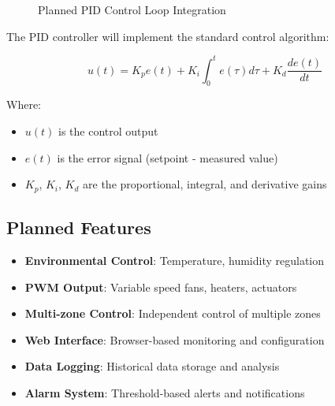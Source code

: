 \documentclass[12pt,a4paper]{article}
\begin{document}
\begin{figure}[h!]
\centering
{}
\caption{Planned PID Control Loop Integration}
\label{fig:pid_control}
\end{figure}

The PID controller will implement the standard control algorithm:

\begin{equation}
u(t) = K_p e(t) + K_i \int_0^t e(\tau) d\tau + K_d \frac{de(t)}{dt}
\end{equation}

Where:
\begin{itemize}
    \item $u(t)$ is the control output
    \item $e(t)$ is the error signal (setpoint - measured value)
    \item $K_p$, $K_i$, $K_d$ are the proportional, integral, and derivative gains
\end{itemize}

\subsection{Planned Features}

\begin{itemize}
    \item \textbf{Environmental Control}: Temperature, humidity regulation
    \item \textbf{PWM Output}: Variable speed fans, heaters, actuators
    \item \textbf{Multi-zone Control}: Independent control of multiple zones
    \item \textbf{Web Interface}: Browser-based monitoring and configuration
    \item \textbf{Data Logging}: Historical data storage and analysis
    \item \textbf{Alarm System}: Threshold-based alerts and notifications
\end{itemize}
\end{document}
